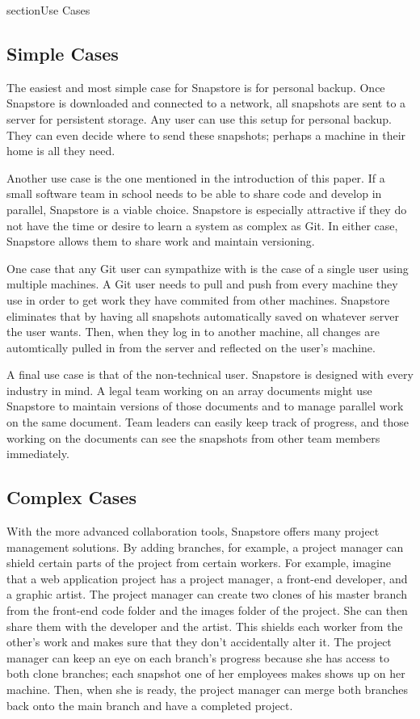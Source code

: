section{Use Cases}

\subsection{Simple Cases}

The easiest and most simple case for Snapstore is for personal backup. Once Snapstore is downloaded and connected to a network, all snapshots are sent to a server for persistent storage. Any user can use this setup for personal backup. They can even decide where to send these snapshots; perhaps a machine in their home is all they need.

Another use case is the one mentioned in the introduction of this paper. If a small software team in school needs to be able to share code and develop in parallel, Snapstore is a viable choice. Snapstore is especially attractive if they do not have the time or desire to learn a system as complex as Git. In either case, Snapstore allows them to share work and maintain versioning.

One case that any Git user can sympathize with is the case of a single user using multiple machines. A Git user needs to pull and push from every machine they use in order to get work they have commited from other machines. Snapstore eliminates that by having all snapshots automatically saved on whatever server the user wants. Then, when they log in to another machine, all changes are automtically pulled in from the server and reflected on the user's machine.

A final use case is that of the non-technical user. Snapstore is designed with every industry in mind. A legal team working on an array documents might use Snapstore to maintain versions of those documents and to manage parallel work on the same document. Team leaders can easily keep track of progress, and those working on the documents can see the snapshots from other team members immediately.

\subsection{Complex Cases}

With the more advanced collaboration tools, Snapstore offers many project management solutions. By adding branches, for example, a project manager can shield certain parts of the project from certain workers. For example, imagine that a web application project has a project manager, a front-end developer, and a graphic artist. The project manager can create two clones of his master branch from the front-end code folder and the images folder of the project. She can then share them with the developer and the artist. This shields each worker from the other's work and makes sure that they don't accidentally alter it. The project manager can keep an eye on each branch's progress because she has access to both clone branches; each snapshot one of her employees makes shows up on her machine. Then, when she is ready, the project manager can merge both branches back onto the main branch and have a completed project.

